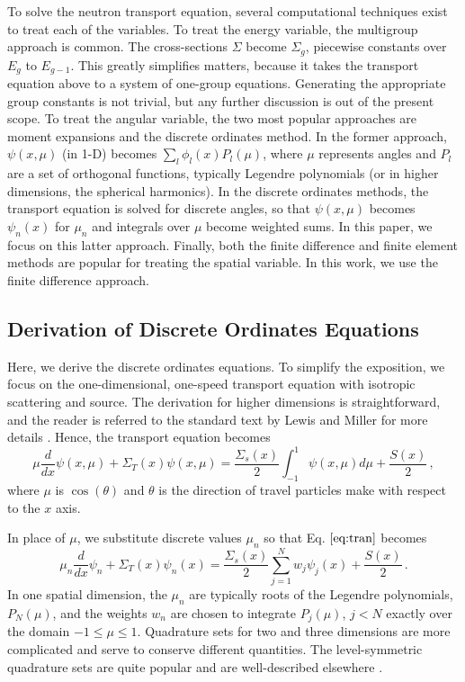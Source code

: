 \documentclass[final,3p,times,11pt]{elsarticle}
\begin{document}
  To solve the neutron transport equation, several computational techniques exist to treat each of the variables.  To treat the energy variable, the multigroup approach is common.  The cross-sections $\Sigma$ become $\Sigma_g$, piecewise constants over $E_g$ to $E_{g-1}$.  This greatly simplifies matters, because it takes the transport equation above to a system of one-group equations.  Generating the appropriate group constants is not trivial, but any further discussion is out of the present scope.  To treat the angular variable, the two most popular approaches are moment expansions and the discrete ordinates method.  In the former approach, $\psi(x,\mu)$ (in 1-D) becomes $\sum_l \phi_l(x) P_l(\mu)$, where $\mu$ represents angles and $P_l$ are a set of orthogonal functions, typically Legendre polynomials (or in higher dimensions, the spherical harmonics).  In the discrete ordinates methods, the transport equation is solved for discrete angles, so that $\psi(x,\mu)$ becomes $\psi_n(x)$ for $\mu_n$
  and integrals over $\mu$ become weighted sums.  In this paper, we focus on this latter approach. Finally, both the finite difference and finite element methods are popular for treating the spatial variable.  In this work, we use the finite difference approach.

\subsection{Derivation of Discrete Ordinates Equations}

  Here, we derive the discrete ordinates equations.  To simplify the exposition, we focus on the one-dimensional, one-speed transport equation with isotropic scattering and source.  The derivation for higher dimensions is straightforward, and the reader is referred to the standard text by Lewis and Miller for more details \cite{lewis1993cmn}.  Hence, the transport equation becomes
  \begin{equation}
    \mu \frac{d}{dx}\psi(x,\mu) + \Sigma_T(x)\psi(x,\mu)= \frac{\Sigma_s(x)}{2} \int^1_{-1}\psi(x,\mu)d\mu + \frac{S(x)}{2} \, ,
    \label{eq:tran}
  \end{equation}
  where $\mu$ is $\cos(\theta)$ and $\theta$ is the direction of travel particles make with respect to the $x$ axis.

  In place of $\mu$, we substitute discrete values $\mu_n$ so that Eq. $\ref{eq:tran}$ becomes
  \begin{equation}
    \mu_n \frac{d}{dx}\psi_n + \Sigma_T(x)\psi_n(x) = \frac{\Sigma_s(x)}{2}  \sum^N_{j=1} w_j \psi_j(x) + \frac{S(x)}{2} \, .
    \label{eq:tranSn}
  \end{equation}
  In one spatial dimension, the $\mu_n$ are typically roots of the Legendre polynomials, $P_N(\mu)$, and the weights $w_n$ are chosen to integrate $P_j(\mu)$, $j<N$ exactly over the domain $-1 \leq \mu \leq 1$.  Quadrature sets for two and three dimensions are more complicated and serve to conserve different quantities.  The level-symmetric quadrature sets are quite popular and are well-described elsewhere \cite{lewis1993cmn}.
\end{document}
